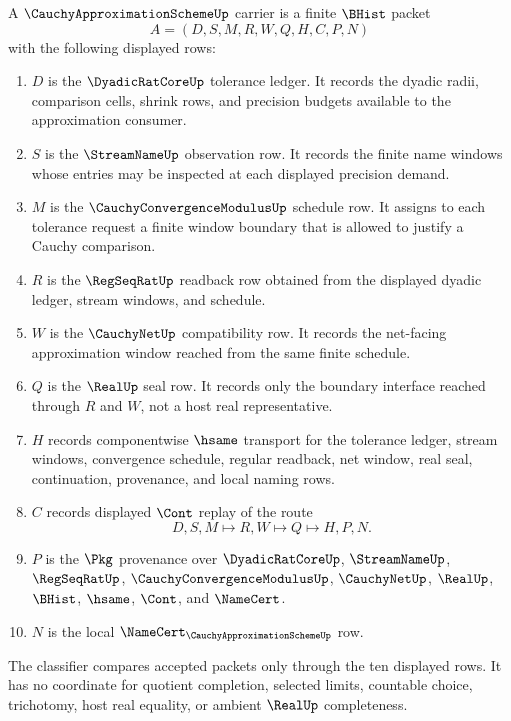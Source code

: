 \begin{definition}
\label{def:cauchy-approximation-scheme-carrier}
A $\CauchyApproximationSchemeUp$ carrier is a finite $\BHist$ packet
$$
A=(D,S,M,R,W,Q,H,C,P,N)
$$
with the following displayed rows:
\begin{enumerate}
\item $D$ is the $\DyadicRatCoreUp$ tolerance ledger. It records the dyadic radii, comparison cells, shrink rows, and precision budgets available to the approximation consumer.
\item $S$ is the $\StreamNameUp$ observation row. It records the finite name windows whose entries may be inspected at each displayed precision demand.
\item $M$ is the $\CauchyConvergenceModulusUp$ schedule row. It assigns to each tolerance request a finite window boundary that is allowed to justify a Cauchy comparison.
\item $R$ is the $\RegSeqRatUp$ readback row obtained from the displayed dyadic ledger, stream windows, and schedule.
\item $W$ is the $\CauchyNetUp$ compatibility row. It records the net-facing approximation window reached from the same finite schedule.
\item $Q$ is the $\RealUp$ seal row. It records only the boundary interface reached through $R$ and $W$, not a host real representative.
\item $H$ records componentwise $\hsame$ transport for the tolerance ledger, stream windows, convergence schedule, regular readback, net window, real seal, continuation, provenance, and local naming rows.
\item $C$ records displayed $\Cont$ replay of the route
$$
D,S,M \longmapsto R,W \longmapsto Q \longmapsto H,P,N .
$$
\item $P$ is the $\Pkg$ provenance over $\DyadicRatCoreUp$, $\StreamNameUp$, $\RegSeqRatUp$, $\CauchyConvergenceModulusUp$, $\CauchyNetUp$, $\RealUp$, $\BHist$, $\hsame$, $\Cont$, and $\NameCert$.
\item $N$ is the local $\NameCert_{\CauchyApproximationSchemeUp}$ row.
\end{enumerate}
The classifier compares accepted packets only through the ten displayed rows. It has no coordinate for quotient completion, selected limits, countable choice, trichotomy, host real equality, or ambient $\RealUp$ completeness.
\end{definition}

